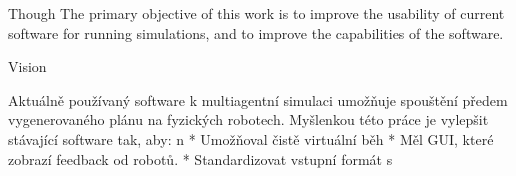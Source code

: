\sec Though
The primary objective of this work is to improve the usability of current software for running simulations, and to improve the capabilities of the software.

\sec Vision

Aktuálně používaný software k multiagentní simulaci umožňuje spouštění předem vygenerovaného plánu na fyzických robotech. Myšlenkou této práce je vylepšit stávající software tak, aby:
\begitems \style n
    * Umožňoval čistě virtuální běh
    * Měl GUI, které zobrazí feedback od robotů.
    * Standardizovat vstupní formát s \mapfIR
\enditems




\bye
\endtt
